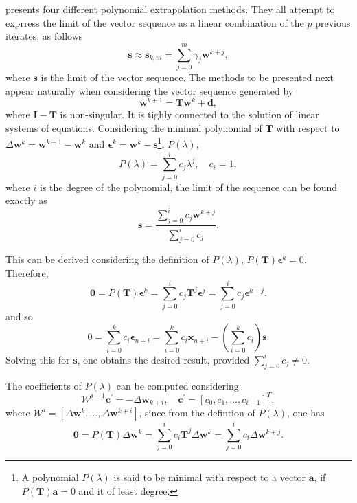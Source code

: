 \cite{sidi_vector_2017} presents four different polynomial extrapolation methods.
They all attempt to exprress the limit of the vector sequence as a linear combination of the \(p\) previous iterates, as follows
\begin{equation}
\mathbf s \approx \mathbf{s}_{k, m}=\sum_{j=0}^{m} \gamma_{j} \mathbf w^{k+j},
\end{equation}
where \(\mathbf s\) is the limit of the vector sequence.
The methods to be presented next appear naturally when considering the vector sequence generated by
\begin{equation}
  \mathbf w^{k+1} = \mathbf{T}\mathbf w^k +\mathbf d,
\end{equation}
where \(\mathbf I - \mathbf T\) is non-singular.
It is tighly connected to the solution of linear systems of equations.
Considering the minimal polynomial of \(\mathbf T\) with respect to \(\Delta \mathbf w^{k} = \mathbf w^{k+1} -\mathbf w^k\) and \(\boldsymbol \epsilon^k = \mathbf w^k - \mathbf s\)\footnote{A polynomial \(P(\lambda)\) is said to be minimal with respect to a vector \(\mathbf a\), if \(P(\mathbf T) \mathbf a = 0\) and it of least degree.}, \(P(\lambda)\),
\begin{equation}
  P(\lambda ) = \sum_{j=0}^i c_j \lambda^j, \quad c_i=1,
\end{equation}
where \(i\) is the degree of the polynomial, the limit of the sequence can be found exactly as
\begin{equation}
  \mathbf s = \frac{ \sum_{j=0}^i c_j \mathbf w^{k+j}}{ \sum_{j=0}^i c_j}.
\end{equation}

This can be derived considering the definition of \(P(\lambda)\), \(P(\mathbf T) \boldsymbol \epsilon^k=0\).
Therefore,
\begin{equation}
\mathbf 0=P(\mathbf T) \boldsymbol \epsilon^{k}=\sum_{j=0}^{i} c_{j} \mathbf T^{j}  \boldsymbol\epsilon^{j}=\sum_{j=0}^{i} c_{j} \boldsymbol \epsilon^{k+j}.
\end{equation}
and so
\begin{equation}
0=\sum_{i=0}^{k} c_{i} \boldsymbol{\epsilon}_{n+i}=\sum_{i=0}^{k} c_{i} \boldsymbol{x}_{n+i}-\left(\sum_{i=0}^{k} c_{i}\right) \mathbf{s}.
\end{equation}
Solving this for \(\mathbf s\), one obtains the desired result, provided \(\sum_{j=0}^{i} c_{j} \neq 0\).

The coefficients of \(P(\lambda)\) can be computed considering
\begin{equation}
\mathscr W^{i-1} \mathbf c^{\prime}=-\Delta \mathbf w_{k+i}, \quad \mathbf c^{\prime}=\left[c_{0}, c_{1}, \ldots, c_{i-1}\right]^{T},
\end{equation}
where \(\mathscr W^i = [\Delta \mathbf w^k, \dots, \Delta \mathbf w^{k+i}]\), since from the defintion of \(P(\lambda)\), one has
\begin{equation}
  \mathbf 0 = P(\mathbf T) \Delta \mathbf w^k = \sum_{j=0}^i c_i \mathbf T^j \Delta \mathbf w^k = \sum_{j=0}^i c_i \Delta \mathbf w^{k+j}.
\end{equation}

